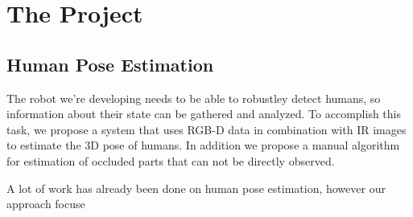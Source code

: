 \chapter{The Project}

\section{Human Pose Estimation}

The robot we're developing needs to be able to robustley detect humans, so information about their state can be gathered and analyzed. To accomplish this task, we propose a system that uses RGB-D data in combination with IR images to estimate the 3D pose of humans. In addition we propose a manual algorithm for estimation of occluded parts that can not be directly observed. 

A lot of work has already been done on human pose estimation, however our approach focuse
